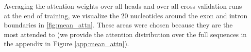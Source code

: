 Averaging the attention weights over all heads and over all cross-validation runs at the end of training, we visualize the 20 nucleotides around the exon and intron boundaries in \ref{fig:mean_attn}. These areas were chosen because they are the most attended to (we provide the attention distribution over the full sequences in the appendix in Figure \ref{app:mean_attn}). 






